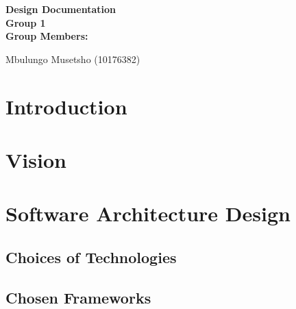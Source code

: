 \documentclass[12pt]{article}
\newcommand{\Title}{Design Documentation} %
\begin{document}
	\vspace{4em}
	
	\begin{center}%
	
	  \LARGE \bf \Title \\[4em]
	  \LARGE {\bf Group 1}\\[1em]
	  \LARGE {\bf Group Members:}\\[2em]
	  \large
	  
	     Mbulungo Musetsho				(10176382) \\[1em]
	    
	\end{center}%
	

	\newpage
	\tableofcontents
	
	\newpage
	\section{Introduction}
	
		\vspace{0.2in}
	
		
		 
	
	\section{Vision}
	
		\vspace{0.2in}
		
				
	
	\section{Software Architecture Design}
		\vspace{0.2in}
		
		\subsection{Choices of Technologies}
			\vspace{0.2in}
		
		
		\subsection{Chosen Frameworks}
					\vspace{0.2in}	
			
\end{document}
